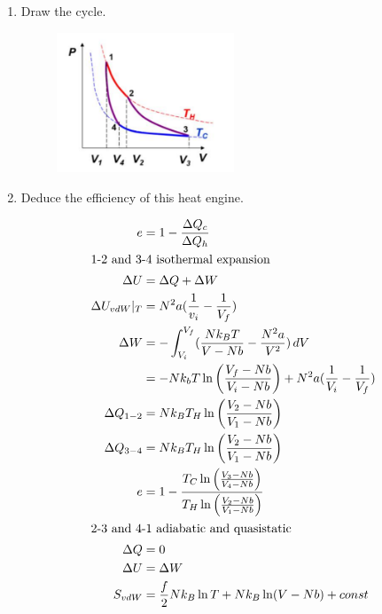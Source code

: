 \documentclass{zc-ust-hw}
\begin{document}
\begin{enumerate}
  \begin{enumerate}
    \item Draw the cycle.
      \begin{sol}\end{sol}
      \begin{figure}[H]
        \begin{center}
          \includegraphics[width=0.5\textwidth]{figures/1705958348.png}
        \end{center}
        \caption{}
      \end{figure}
    \item Deduce the efficiency of this heat engine.
      \begin{sol}
        \begin{align}
          e &= 1-\frac{\Delta Q_c}{\Delta Q_h} \\
          \intertext{1-2 and 3-4 isothermal expansion}
          \Delta U&=\Delta Q+\Delta W \\
          \Delta U_{vdW} |_T &= N^2a(\frac{1}{v_i}-\frac{1}{V_f}) \\
          \Delta W &= -\int_{V_i}^{V_f} (\frac{Nk_BT}{V-Nb}-\frac{N^2a}{V^2}) \, dV \\
                   &= -Nk_bT\ln \left( \frac{V_f-Nb}{V_i-Nb} \right) +N^2a(\frac{1}{V_i}-\frac{1}{V_f}) \\
          \Delta Q_{1-2} &= Nk_BT_H\ln \left( \frac{V_2-Nb}{V_1-Nb} \right) \\
          \Delta Q_{3-4} &= Nk_BT_H\ln \left( \frac{V_2-Nb}{V_1-Nb} \right) \\
          e &= 1 - \frac{T_C\ln \left( \frac{V_3-Nb}{V_4-Nb} \right) }{T_H\ln \left( \frac{V_2-Nb}{V_1-Nb} \right) } \\
          \intertext{2-3 and 4-1 adiabatic and quasistatic}
          \Delta Q &= 0 \\
          \Delta U &= \Delta W \\
          S_{vdW}&=\frac{f}{2}Nk_B\ln T+Nk_B\ln (V-Nb)+const \\

\end{align}
\end{sol}
\end{enumerate}
\end{enumerate}
\end{document}

